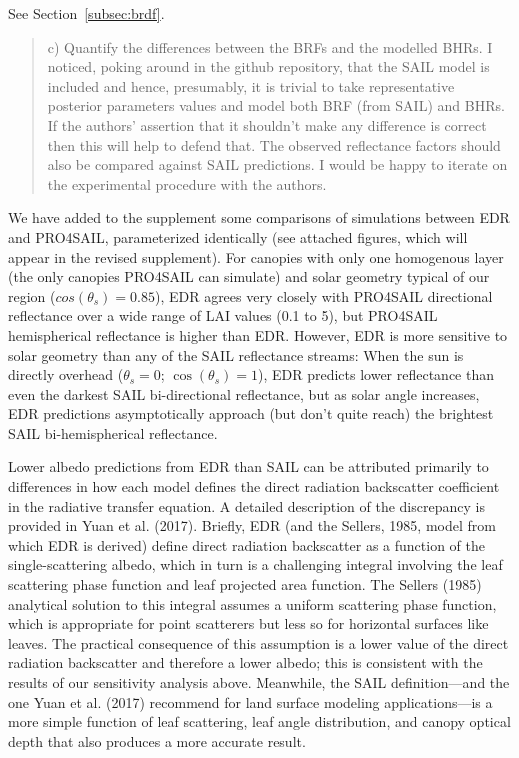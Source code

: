See Section~\ref{subsec:brdf}.

\begin{quote}
  c) Quantify the differences between the BRFs and the modelled BHRs.
  I noticed, poking around in the github repository, that the SAIL model is included and hence, presumably, it is trivial to take representative posterior parameters values and model both BRF (from SAIL) and BHRs.
  If the authors’ assertion that it shouldn’t make any difference is correct then this will help to defend that.
  The observed reflectance factors should also be compared against SAIL predictions.
  I would be happy to iterate on the experimental procedure with the authors.
\end{quote}

We have added to the supplement some comparisons of simulations between EDR and PRO4SAIL, parameterized identically (see attached figures, which will appear in the revised supplement).
For canopies with only one homogenous layer (the only canopies PRO4SAIL can simulate) and solar geometry typical of our region ($cos(\theta_{s}) = 0.85$), EDR agrees very closely with PRO4SAIL directional reflectance over a wide range of LAI values (0.1 to 5), but PRO4SAIL hemispherical reflectance is higher than EDR.\@
However, EDR is more sensitive to solar geometry than any of the SAIL reflectance streams:
When the sun is directly overhead ($\theta_{s} = 0$; $\cos(\theta_{s}) = 1$), EDR predicts lower reflectance than even the darkest SAIL bi-directional reflectance,
but as solar angle increases, EDR predictions asymptotically approach (but don’t quite reach) the brightest SAIL bi-hemispherical reflectance.

Lower albedo predictions from EDR than SAIL can be attributed primarily to differences in how each model defines the direct radiation backscatter coefficient in the radiative transfer equation.
A detailed description of the discrepancy is provided in Yuan et al. (2017). Briefly, EDR (and the Sellers, 1985, model from which EDR is derived) define direct radiation backscatter as a function of the single-scattering albedo, which in turn is a challenging integral involving the leaf scattering phase function and leaf projected area function. The Sellers (1985) analytical solution to this integral assumes a uniform scattering phase function, which is appropriate for point scatterers but less so for horizontal surfaces like leaves. The practical consequence of this assumption is a lower value of the direct radiation backscatter and therefore a lower albedo; this is consistent with the results of our sensitivity analysis above. Meanwhile, the SAIL definition---and the one Yuan et al. (2017) recommend for land surface modeling applications---is a more simple function of leaf scattering, leaf angle distribution, and canopy optical depth that also produces a more accurate result.

